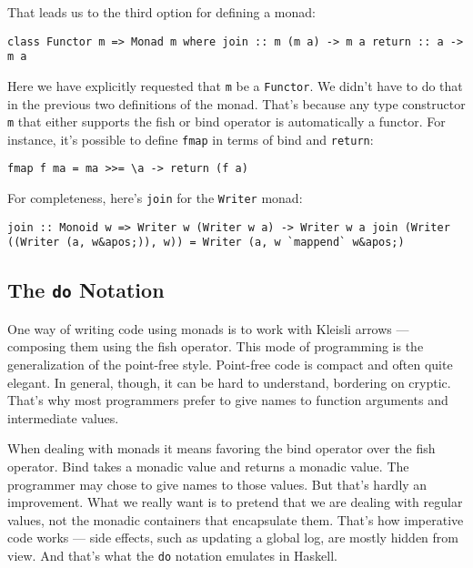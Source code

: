 That leads us to the third option for defining a monad:

\begin{verbatim}
class Functor m => Monad m where join :: m (m a) -> m a return :: a -> m a
\end{verbatim}

Here we have explicitly requested that \texttt{m} be a \texttt{Functor}.
We didn't have to do that in the previous two definitions of the monad.
That's because any type constructor \texttt{m} that either supports the
fish or bind operator is automatically a functor. For instance, it's
possible to define \texttt{fmap} in terms of bind and \texttt{return}:

\begin{verbatim}
fmap f ma = ma >>= \a -> return (f a)
\end{verbatim}

For completeness, here's \texttt{join} for the \texttt{Writer} monad:

\begin{verbatim}
join :: Monoid w => Writer w (Writer w a) -> Writer w a join (Writer ((Writer (a, w&apos;)), w)) = Writer (a, w `mappend` w&apos;)
\end{verbatim}

\subsection{\texorpdfstring{The \texttt{do}
Notation}{The do Notation}}\label{the-do-notation}

One way of writing code using monads is to work with Kleisli arrows ---
composing them using the fish operator. This mode of programming is the
generalization of the point-free style. Point-free code is compact and
often quite elegant. In general, though, it can be hard to understand,
bordering on cryptic. That's why most programmers prefer to give names
to function arguments and intermediate values.

When dealing with monads it means favoring the bind operator over the
fish operator. Bind takes a monadic value and returns a monadic value.
The programmer may chose to give names to those values. But that's
hardly an improvement. What we really want is to pretend that we are
dealing with regular values, not the monadic containers that encapsulate
them. That's how imperative code works --- side effects, such as
updating a global log, are mostly hidden from view. And that's what the
\texttt{do} notation emulates in Haskell.

